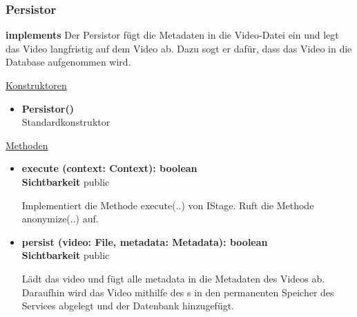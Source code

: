 \subsubsection{Persistor} \label{service:klasse:Persistor}
\textbf{implements}  \newline
Der Persistor fügt die Metadaten in die Video-Datei ein und legt das Video langfristig auf dem Video ab. Dazu sogt er dafür, dass das Video in die Database aufgenommen wird.\newline

\underline{Konstruktoren}
\begin{itemize}
\itemsep0pt
\item \textbf{Persistor()} \hfill\\
Standardkonstruktor
\end{itemize}

\underline{Methoden}
\begin{itemize}
\itemsep0pt
\item \textbf{execute (context: Context): boolean}\hfill\\
\textbf{Sichtbarkeit} public

Implementiert die Methode execute(..) von IStage. Ruft die Methode anonymize(..) auf.

\item \textbf{persist (video: File, metadata: Metadata): boolean}\hfill\\
\textbf{Sichtbarkeit} public

Lädt das video und fügt alle metadata in die Metadaten des Videos ab. Daraufhin wird das Video mithilfe des s in den permanenten Speicher des Services abgelegt und der Datenbank hinzugefügt.

\end{itemize}